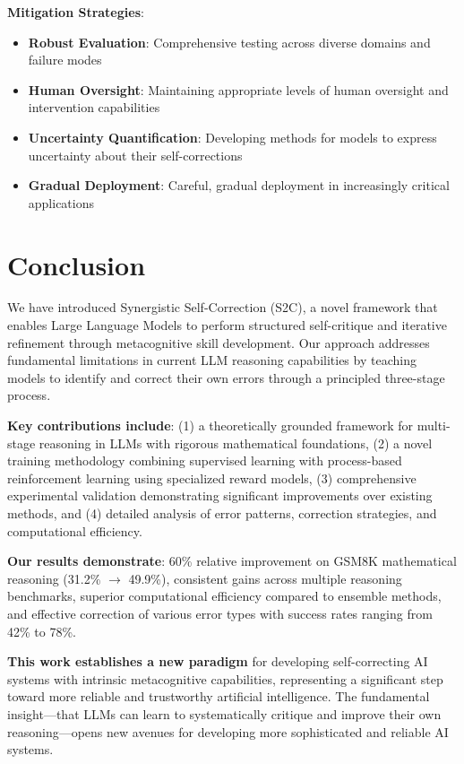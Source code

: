 \documentclass[10pt,twocolumn]{article}
\newcommand{\ssc}{\textsc{S2C}}
\begin{document}
\textbf{Mitigation Strategies}:
\begin{itemize}
\item \textbf{Robust Evaluation}: Comprehensive testing across diverse domains and failure modes
\item \textbf{Human Oversight}: Maintaining appropriate levels of human oversight and intervention capabilities
\item \textbf{Uncertainty Quantification}: Developing methods for models to express uncertainty about their self-corrections
\item \textbf{Gradual Deployment}: Careful, gradual deployment in increasingly critical applications
\end{itemize}

\section{Conclusion}

We have introduced Synergistic Self-Correction (\ssc{}), a novel framework that enables Large Language Models to perform structured self-critique and iterative refinement through metacognitive skill development. Our approach addresses fundamental limitations in current LLM reasoning capabilities by teaching models to identify and correct their own errors through a principled three-stage process.

\textbf{Key contributions include}: (1) a theoretically grounded framework for multi-stage reasoning in LLMs with rigorous mathematical foundations, (2) a novel training methodology combining supervised learning with process-based reinforcement learning using specialized reward models, (3) comprehensive experimental validation demonstrating significant improvements over existing methods, and (4) detailed analysis of error patterns, correction strategies, and computational efficiency.

\textbf{Our results demonstrate}: 60\% relative improvement on GSM8K mathematical reasoning (31.2\% $\rightarrow$ 49.9\%), consistent gains across multiple reasoning benchmarks, superior computational efficiency compared to ensemble methods, and effective correction of various error types with success rates ranging from 42\% to 78\%.

\textbf{This work establishes a new paradigm} for developing self-correcting AI systems with intrinsic metacognitive capabilities, representing a significant step toward more reliable and trustworthy artificial intelligence. The fundamental insight—that LLMs can learn to systematically critique and improve their own reasoning—opens new avenues for developing more sophisticated and reliable AI systems.
\end{document}
